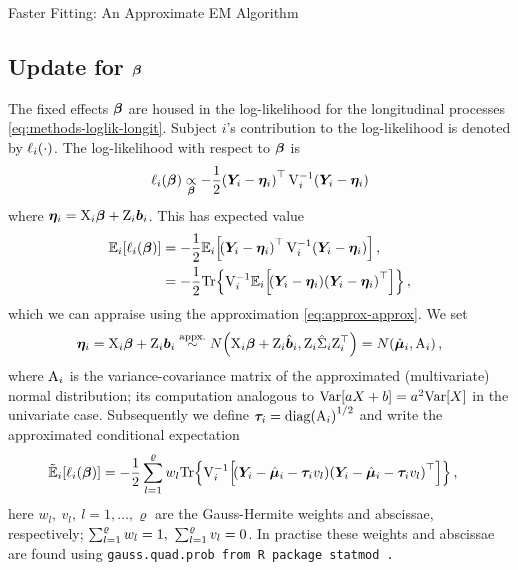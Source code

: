 \begin{chapter}{\label{cha:approx}Faster Fitting: An Approximate EM Algorithm}
  \subsection{Update for \texorpdfstring{$\bm{\beta}$}{betagauss}}\label{sec:approx-Mstep-betagauss}
  The fixed effects $\bm{\beta}$ are housed in the log-likelihood for the longitudinal processes \eqref{eq:methods-loglik-longit}. Subject $i$'s contribution to the log-likelihood is denoted by $\ell_i\!\left(\cdot\right)$. The log-likelihood with respect to $\bm{\beta}$ is
  \begin{align*}
      \ell_i\!\left(\bm{\beta}\right)\underset{\bm{\beta}}{\propto}-\frac{1}{2}\!\left(\bm{Y}_i-\bm{\eta}_i\right)^\top\mathrm{V}_i^{-1}\!\left(\bm{Y}_i-\bm{\eta}_i\right)
  \end{align*}
  where $\bm{\eta}_i=\mathrm{X}_i\bm{\beta}+\mathrm{Z}_i\bm{b}_i$. This has expected value
  \begin{align*}
      \Expi{\elli{\bb}}&=-\frac{1}{2}\Expi{\crossprod{\lb\Y-\bm{\eta}_i\rb}{\mathrm{V}_i^{-1}\lb\Y-\bm{\eta}_i\rb}},\\
      &=-\frac{1}{2}\mathrm{Tr}\lbr\mathrm{V}_i^{-1}\Expi{\tcrossprod{\lb\Y-\bm{\eta}_i\rb}}\rbr,
  \end{align*}
  which we can appraise using the approximation \eqref{eq:approx-approx}. We set
  \begin{align}
      \bm{\eta}_i=\mathrm{X}_i\bm{\beta}+\mathrm{Z}_i\bm{b}_i\overset{\text{appx.}}{\sim} N\!\left(\mathrm{X}_i\bm{\beta}+\mathrm{Z}_i\hat{\bm{b}}_i,\mathrm{Z}_i\hat{\Sigma}_i\mathrm{Z}_i^\top\right)=N\!\left(\hat{\bm{\mu}}_i,\mathrm{A}_i\right),
  \label{eq:approx-Mstep-longitappx}
  \end{align}
  where $\mathrm{A}_i$ is the variance-covariance matrix of the approximated (multivariate) normal distribution; its computation analogous to $\mathrm{Var}\!\left[ aX + b\right]=a^2\mathrm{Var}\!\left[ X\right]$ in the univariate case. Subsequently we define $\bm{\tau}_i=\mathrm{diag}\!\left(\mathrm{A}_i\right)^{1/2}$ and write the approximated conditional expectation 
  \begin{align*}
      \tilde{\mathbb{E}}_i\!\left[\ell_i\!\left(\bm{\beta}\right)\right]&=-\frac{1}{2}\sum_{l=1}^\varrho w_l\mathrm{Tr}\!\left\{\mathrm{V}_i^{-1}\!\left[\!\left(\bm{Y}_i-\hat{\bm{\mu}}_i-\bm{\tau}_i v_l\right)\!\left(\bm{Y}_i-\hat{\bm{\mu}}_i-\bm{\tau}_i v_l\right)^\top\right]\right\},
  \end{align*}
  here $w_l,\ v_l,\ l=1,\dots,\varrho$ are the Gauss-Hermite weights and abscissae, respectively; $\sum_{l=1}^\varrho w_l = 1,\ \sum_{l=1}^\varrho v_l = 0$. In practise these weights and abscissae are found using \tt{gauss.quad.prob} from  \tt{R} package \tt{statmod} \citep{quadrature}. 


\end{chapter}
